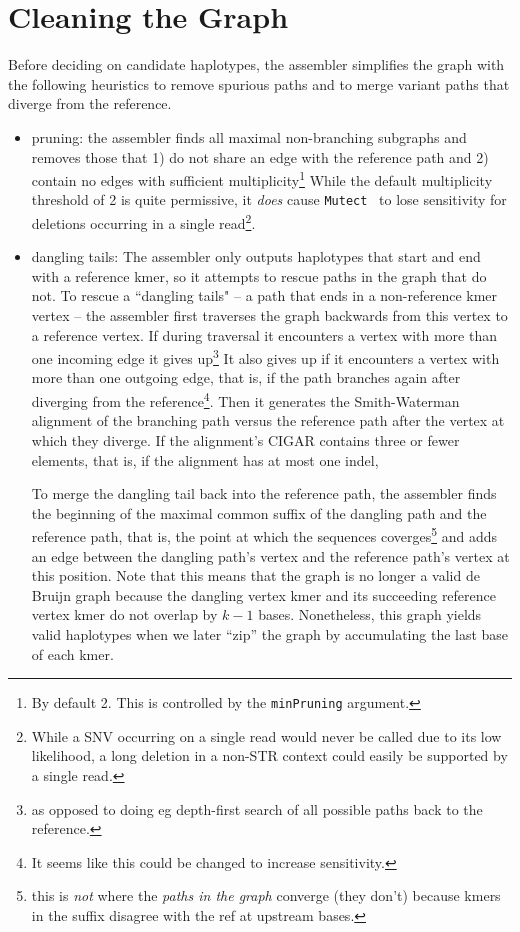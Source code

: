 \documentclass[nofootinbib,amssymb,amsmath]{revtex4}
\newcommand{\Mutect}{\texttt{Mutect}}
\newcommand{\code}[1]{\texttt{#1}}
\begin{document}
\section{Cleaning the Graph} \label{graph-cleaning}
Before deciding on candidate haplotypes, the assembler simplifies the graph with the following heuristics to remove spurious paths and to merge variant paths that diverge from the reference.
\begin{itemize}
\item pruning: the assembler finds all maximal non-branching subgraphs and removes those that 1) do not share an edge with the reference path and 2) contain no edges with sufficient multiplicity\footnote{By default 2.  This is controlled by the \code{minPruning} argument.}  While the default multiplicity threshold of 2 is quite permissive, it \textit{does} cause \Mutect~ to lose sensitivity for deletions occurring in a single read\footnote{While a SNV occurring on a single read would never be called due to its low likelihood, a long deletion in a non-STR context could easily be supported by a single read.}.
\item dangling tails: The assembler only outputs haplotypes that start and end with a reference kmer, so it attempts to rescue paths in the graph that do not.  To rescue a ``dangling tails" -- a path that ends in a non-reference kmer vertex -- the assembler first traverses the graph backwards from this vertex to a reference vertex.  If during traversal it encounters a vertex with more than one incoming edge it gives up\footnote{as opposed to doing eg depth-first search of all possible paths back to the reference.}  It also gives up if it encounters a vertex with more than one outgoing edge, that is, if the path branches again after diverging from the reference\footnote{It seems like this could be changed to increase sensitivity.}.  Then it generates the Smith-Waterman alignment of the branching path versus the reference path after the vertex at which they diverge.  If the alignment's CIGAR contains three or fewer elements, that is, if the alignment has at most one indel,

To merge the dangling tail back into the reference path, the assembler finds the beginning of the maximal common suffix of the dangling path and the reference path, that is, the point at which the sequences coverges\footnote{this is \textit{not} where the \textit{paths in the graph} converge (they don't) because kmers in the suffix disagree with the ref at upstream bases.} and adds an edge between the dangling path's vertex and the reference path's vertex at this position.  Note that this means that the graph is no longer a valid de Bruijn graph because the dangling vertex kmer and its succeeding reference vertex kmer do not overlap by $k - 1$ bases.  Nonetheless, this graph yields valid haplotypes when we later ``zip'' the graph by accumulating the last base of each kmer.


\end{itemize}
\end{document}
